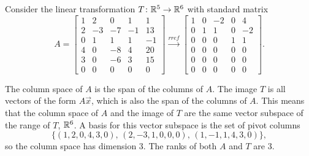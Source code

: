 \begin{example}
Consider the linear transformation $T\colon {\ensuremath{\mathbb{R}}}^5\to {\ensuremath{\mathbb{R}}}^6$ with standard matrix 
$$A=\begin{bmatrix}
 1 & 2 & 0 & 1 & 1 \\
 2 & -3 & -7 & -1 & 13 \\
 0 & 1 & 1 & 1 & -1 \\
 4 & 0 & -8 & 4 & 20 \\
 3 & 0 & -6 & 3 & 15 \\
 0 & 0 & 0 & 0 & 0
 \end{bmatrix} 
\xrightarrow{rref}
\begin{bmatrix}
 1 & 0 & -2 & 0 & 4 \\
 0 & 1 & 1 & 0 & -2 \\
 0 & 0 & 0 & 1 & 1 \\
 0 & 0 & 0 & 0 & 0 \\
 0 & 0 & 0 & 0 & 0 \\
 0 & 0 & 0 & 0 & 0
\end{bmatrix}.$$

The column space of $A$ is the span of the columns of $A$. 
The image $T$ is all vectors of the form $A\vec x$, which is also the span of the columns of $A$. 
This means that the column space of $A$ and the image of $T$ are the same vector subspace of the range of $T$, ${\mathbb{R}}^6$.
A basis for this vector subspace is the set of pivot columns $$\{(1, 2, 0, 4, 3, 0),\, (2, -3, 1, 0, 0, 0),\, (1, -1, 1, 4, 3, 0)\},$$ so the column space has dimension 3. The ranks of both $A$ and $T$ are 3.


\end{example}
